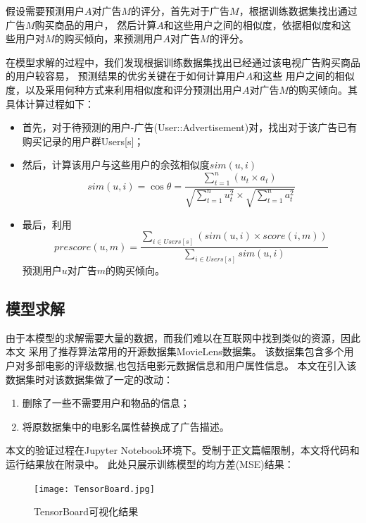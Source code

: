 假设需要预测用户$A$对广告$M$的评分，首先对于广告$M$，根据训练数据集找出通过广告$M$购买商品的用户，
然后计算$A$和这些用户之间的相似度，依据相似度和这些用户对$M$的购买倾向，来预测用户$A$对广告$M$的评分。

在模型求解的过程中，我们发现根据训练数据集找出已经通过该电视广告购买商品的用户较容易，
预测结果的优劣关键在于如何计算用户$A$和这些
用户之间的相似度，以及采用何种方式来利用相似度和评分预测出用户$A$对广告$M$的购买倾向。其具体计算过程如下：

\begin{itemize}
    \item 首先，对于待预测的用户-广告(User::Advertisement)对，找出对于该广告已有购买记录的用户群Users[s]；
    \item 然后，计算该用户与这些用户的余弦相似度$sim(u,i)$
    \begin{equation}
        sim(u,i)=\cos\theta=\frac{\sum\limits_{t=1}^{n}(u_t\times a_t)}{\sqrt{\sum\limits_{t=1}^{n}u_t^2}\times \sqrt{\sum\limits_{t=1}^{n}a_t^2}}
    \end{equation}
    \item 最后，利用
    \begin{equation}
        prescore(u,m)=\frac{\sum\limits_{i\in Users[s]}(sim(u,i)\times score(i,m))}{\sum\limits_{i\in Users[s]}sim(u,i)}
    \end{equation}
    预测用户$u$对广告$m$的购买倾向。
\end{itemize}

\subsection{模型求解}

由于本模型的求解需要大量的数据，而我们难以在互联网中找到类似的资源，因此本文
采用了推荐算法常用的开源数据集MovieLens数据集。
该数据集包含多个用户对多部电影的评级数据,也包括电影元数据信息和用户属性信息。
本文在引入该数据集时对该数据集做了一定的改动：
\begin{enumerate}
    \item 删除了一些不需要用户和物品的信息；
    \item 将原数据集中的电影名属性替换成了广告描述。
\end{enumerate}

本文的验证过程在Jupyter Notebook环境下。受制于正文篇幅限制，本文将代码和运行结果放在附录中。
此处只展示训练模型的均方差(MSE)结果：

\begin{figure}[H]
    \centering
    \texttt{[image: TensorBoard.jpg]}
    \caption{TensorBoard可视化结果}
\end{figure}

